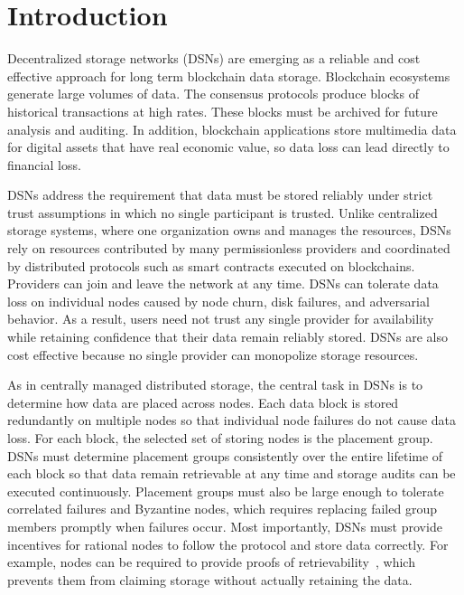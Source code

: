 \section{Introduction}
\label{sec:intro}

Decentralized storage networks (DSNs) are emerging as a reliable and cost effective approach for long term blockchain data storage.
Blockchain ecosystems generate large volumes of data.
The consensus protocols produce blocks of historical transactions at high rates.
These blocks must be archived for future analysis and auditing.
In addition, blockchain applications store multimedia data for digital assets that have real economic value, so data loss can lead directly to financial loss.

DSNs address the requirement that data must be stored reliably under strict trust assumptions in which no single participant is trusted.
Unlike centralized storage systems, where one organization owns and manages the resources, DSNs rely on resources contributed by many permissionless providers and coordinated by distributed protocols such as smart contracts executed on blockchains.
Providers can join and leave the network at any time.
DSNs can tolerate data loss on individual nodes caused by node churn, disk failures, and adversarial behavior.
As a result, users need not trust any single provider for availability while retaining confidence that their data remain reliably stored.
DSNs are also cost effective because no single provider can monopolize storage resources.

As in centrally managed distributed storage, the central task in DSNs is to determine how data are placed across nodes.
Each data block is stored redundantly on multiple nodes so that individual node failures do not cause data loss.
For each block, the selected set of storing nodes is the placement group.
DSNs must determine placement groups consistently over the entire lifetime of each block so that data remain retrievable at any time and storage audits can be executed continuously.
Placement groups must also be large enough to tolerate correlated failures and Byzantine nodes, which requires replacing failed group members promptly when failures occur.
Most importantly, DSNs must provide incentives for rational nodes to follow the protocol and store data correctly.
For example, nodes can be required to provide proofs of retrievability~\cite{por}, which prevents them from claiming storage without actually retaining the data.

